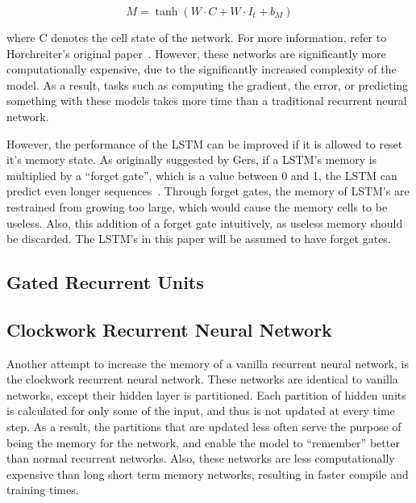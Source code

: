 \documentclass{article}
\begin{document}
$$M = \tanh(W\cdot C + W\cdot I_t + b_M)$$

where C denotes the cell state of the network. For more information, refer to
Horchreiter's original paper~\cite{lstm}. However, these networks are
significantly more computationally expensive, due to the significantly increased
complexity of the model. As a result, tasks such as computing the gradient, the
error, or predicting something with these models takes more time than a
traditional recurrent neural network.

However, the performance of the LSTM can be improved if it is allowed to reset
it's memory state. As originally suggested by Gers, if a LSTM's memory is
multiplied by a ``forget gate'', which is a value between 0 and 1, the LSTM can
predict even longer sequences~\cite{forget}. Through forget gates, the memory of
LSTM's are restrained from growing too large, which would cause the memory cells
to be useless. Also, this addition of a forget gate intuitively, as useless
memory should be discarded. The LSTM's in this paper will be assumed to have
forget gates.


\subsection{Gated Recurrent Units}


\subsection{Clockwork Recurrent Neural Network}
Another attempt to increase the memory of a vanilla recurrent neural network, is
the clockwork recurrent neural network. These networks are identical to vanilla
networks, except their hidden layer is partitioned. Each partition of hidden
units is calculated for only some of the input, and thus is not updated at every
time step. As a result, the partitions that are updated less often serve the
purpose of being the memory for the network, and enable the model to
``remember'' better than normal recurrent networks. Also, these networks are
less computationally expensive than long short term memory networks, resulting
in faster compile and training times.
\end{document}

